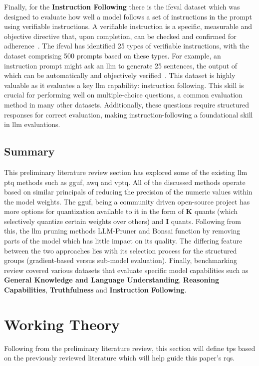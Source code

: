 \documentclass{ifacconf}
\begin{document}
	Finally, for the \textbf{Instruction Following} there is the \gls{ifeval} dataset which was designed to evaluate how well a model follows a set of instructions in the prompt using verifiable instructions. A verifiable instruction is a specific, measurable and objective directive that, upon completion, can be checked and confirmed for adherence~\cite{zhou2023instructionfollowingevaluationlargelanguage}. The \gls{ifeval} has identified 25 types of verifiable instructions, with the dataset comprising 500 prompts based on these types. For example, an instruction prompt might ask an \gls{llm} to generate 25 sentences, the output of which can be automatically and objectively verified~\cite{zhou2023instructionfollowingevaluationlargelanguage}. This dataset is highly valuable as it evaluates a key \gls{llm} capability: instruction following. This skill is crucial for performing well on multiple-choice questions, a common evaluation method in many other datasets. Additionally, these questions require structured responses for correct evaluation, making instruction-following a foundational skill in \gls{llm} evaluations.
	
	\subsection{Summary}
	This preliminary literature review section has explored some of the existing \gls{llm} \gls{ptq} methods such as \gls{gguf}, \gls{awq} and \gls{vptq}. All of the discussed methods operate based on similar principals of reducing the precision of the numeric values within the model weights. The \gls{gguf}, being a community driven open-source project has more options for quantization available to it in the form of \textbf{K} quants (which selectively quantize certain weights over others) and \textbf{I} quants. Following from this, the \gls{llm} pruning methods LLM-Pruner and Bonsai function by removing parts of the model which has little impact on its quality. The differing feature between the two approaches lies with its selection process for the structured groups (gradient-based versus sub-model evaluation). Finally, benchmarking review covered various datasets that evaluate specific model capabilities such as \textbf{General Knowledge and Language Understanding}, \textbf{Reasoning Capabilities}, \textbf{Truthfulness} and \textbf{Instruction Following}. 
	
	\section{Working Theory}
	Following from the preliminary literature review, this section will define \glspl{tp} based on the previously reviewed literature which will help guide this paper's \glspl{rq}.
	
\end{document}
